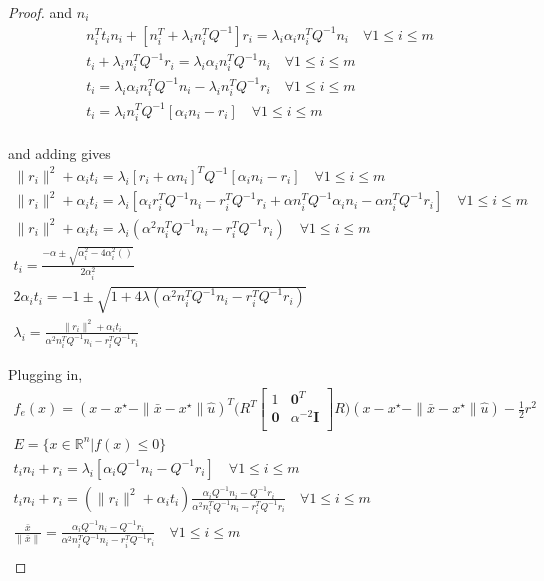 \begin{proof}
and $n_i$
\begin{align*}
n_i^Tt_in_i + \left[n_i^T + \lambda_i n_i^TQ^{-1}\right]r_i = \lambda_i\alpha_i n_i^TQ^{-1} n_i \quad \forall 1\le i\le m \\
t_i + \lambda_i n_i^TQ^{-1}r_i = \lambda_i\alpha_i n_i^TQ^{-1} n_i \quad \forall 1\le i\le m \\
t_i = \lambda_i\alpha_i n_i^TQ^{-1} n_i - \lambda_i n_i^TQ^{-1}r_i \quad \forall 1\le i\le m \\
t_i = \lambda_in_i^TQ^{-1}\left[\alpha_i n_i - r_i\right] \quad \forall 1\le i\le m \\
\end{align*}

and adding gives
\begin{align*}
\|r_i\|^2  + \alpha_i t_i = \lambda_i\left[r_i + \alpha n_i\right]^TQ^{-1}\left[\alpha_i n_i - r_i\right] \quad \forall 1\le i\le m \\
\|r_i\|^2  + \alpha_i t_i = \lambda_i\left[ \alpha_ir_i^T Q^{-1} n_i - r_i^T Q^{-1}r_i  + \alpha n_i^TQ^{-1}\alpha_i n_i - \alpha n_i^TQ^{-1}r_i   \right] \quad \forall 1\le i\le m \\
\|r_i\|^2  + \alpha_i t_i = \lambda_i\left(\alpha^2 n_i^TQ^{-1} n_i - r_i^T Q^{-1}r_i  \right) \quad \forall 1\le i\le m \\
t_i = \frac{-\alpha \pm \sqrt{\alpha_i^2 - 4\alpha_i^2()}}{2\alpha_i^2} \\
2\alpha_it_i = -1 \pm \sqrt{1 + 4\lambda(\alpha^2 n_i^TQ^{-1} n_i - r_i^T Q^{-1}r_i)} \\
\lambda_i = \frac{\|r_i\|^2  + \alpha_i t_i}{\alpha^2 n_i^TQ^{-1} n_i - r_i^T Q^{-1}r_i}
\end{align*}

Plugging in,
\begin{align*}
f_e(x) = (x - x^{\star} - \|\bar x - x^{\star} \|\hat u)^T\bigg(R^T\begin{bmatrix}
1 & \boldsymbol0^T \\
\boldsymbol 0 & \alpha^{-2} \boldsymbol I \\
\end{bmatrix}R\bigg)(x - x^{\star} - \|\bar x - x^{\star} \|\hat u) - \frac 1 2 r^2 \\
E = \{x \in \mathbb R^n | f(x) \le 0\} \\
t_in_i + r_i = \lambda_i \left[\alpha_i Q^{-1} n_i - Q^{-1}r_i \right] \quad \forall 1\le i\le m \\
t_in_i + r_i = (\|r_i\|^2  + \alpha_i t_i)\frac{\alpha_i Q^{-1} n_i - Q^{-1}r_i}{\alpha^2 n_i^TQ^{-1} n_i - r_i^T Q^{-1}r_i} \quad \forall 1\le i\le m \\
\frac{\bar x}{\|\bar x\|} = \frac{\alpha_i Q^{-1} n_i - Q^{-1}r_i}{\alpha^2 n_i^TQ^{-1} n_i - r_i^T Q^{-1}r_i} \quad \forall 1\le i\le m \\
\end{align*}


\end{proof}
